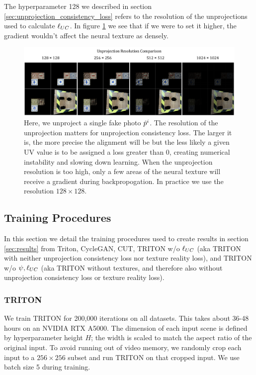 	\bigskip
	
	The hyperparameter 128 we described in section \ref{sec:unprojection_consistency_loss} refers to the resolution of the unprojections used to calculate $\ell_{UC}$.
	In figure \ref{fig:unprojection_resolution_comparison} we see that if we were to set it higher, the gradient wouldn't affect the neural texture as densely.

	\begin{figure}[H]
		\begin{center}
			\includegraphics[width=400pt]{../images/unprojection_resolution_comparison.pdf}
		\end{center}
		\caption{
			Here, we unproject a single fake photo $\hat{p}^i$. The resolution of the unprojection matters for unprojection consistency loss. The larger it is, the more precise the alignment will be but the less likely a given UV value is to be assigned a loss greater than 0, creating numerical instability and slowing down learning. 
			When the unprojection resolution is too high, only a few areas of the neural texture will receive a gradient during backpropogation. In practice we use the resolution $128\times128$.
		}
		\label{fig:unprojection_resolution_comparison}
	\end{figure}

\subsection{Training Procedures}

	In this section we detail the training procedures used to create results in section \ref{sec:results} from Triton, CycleGAN, CUT,
		TRITON w/o $\ell_{UC}$ (aka TRITON with neither unprojection consistency loss nor texture reality loss), and
		TRITON w/o $\psi, \ell_{UC}$ (aka TRITON without textures, and therefore also without unprojection consistency loss or texture reality loss).

	\subsubsection{TRITON}
	\label{par:triton}
	We train TRITON for 200,000 iterations on all datasets. This takes about 36-48 hours on an NVIDIA RTX A5000. 
	The dimension of each input scene is defined by hyperparameter height $H$; the width is scaled to match the aspect ratio of the original input.
	To avoid running out of video memory, we randomly crop each input to a $256\times256$ subset and run TRITON on that cropped input.
	We use batch size 5 during training.
	
